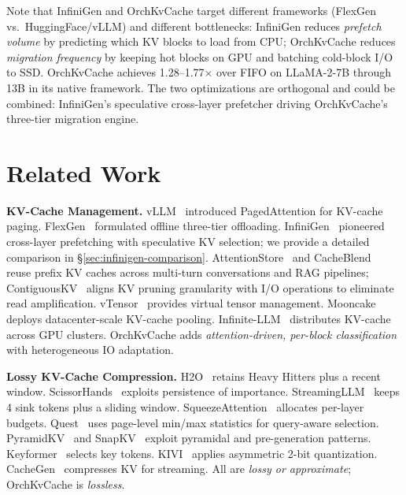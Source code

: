 \documentclass[conference]{IEEEtran}
\begin{document}
Note that InfiniGen and OrchKvCache target different frameworks (FlexGen vs.\ HuggingFace/vLLM) and different bottlenecks: InfiniGen reduces \emph{prefetch volume} by predicting which KV blocks to load from CPU; OrchKvCache reduces \emph{migration frequency} by keeping hot blocks on GPU and batching cold-block I/O to SSD.  OrchKvCache achieves 1.28--1.77$\times$ over FIFO on LLaMA-2-7B through 13B in its native framework.  The two optimizations are orthogonal and could be combined: InfiniGen's speculative cross-layer prefetcher driving OrchKvCache's three-tier migration engine.



\section{Related Work}

\textbf{KV-Cache Management.} vLLM~\cite{vllm} introduced PagedAttention for KV-cache paging. FlexGen~\cite{flexgen} formulated offline three-tier offloading. InfiniGen~\cite{infinigen} pioneered cross-layer prefetching with speculative KV selection; we provide a detailed comparison in \S\ref{sec:infinigen-comparison}. AttentionStore~\cite{attentionstore} and CacheBlend~\cite{cacheblend} reuse prefix KV caches across multi-turn conversations and RAG pipelines; ContiguousKV~\cite{contiguouskv} aligns KV pruning granularity with I/O operations to eliminate read amplification. vTensor~\cite{vtensor} provides virtual tensor management. Mooncake~\cite{mooncake} deploys datacenter-scale KV-cache pooling. Infinite-LLM~\cite{infinitellm} distributes KV-cache across GPU clusters. OrchKvCache adds \emph{attention-driven, per-block classification} with heterogeneous IO adaptation.

\textbf{Lossy KV-Cache Compression.} H2O~\cite{h2o} retains Heavy Hitters plus a recent window. ScissorHands~\cite{scissorhands} exploits persistence of importance. StreamingLLM~\cite{streamingllm} keeps 4 sink tokens plus a sliding window. SqueezeAttention~\cite{squeezeattention} allocates per-layer budgets. Quest~\cite{quest} uses page-level min/max statistics for query-aware selection. PyramidKV~\cite{pyramidkv} and SnapKV~\cite{snapkv} exploit pyramidal and pre-generation patterns. Keyformer~\cite{keyformer} selects key tokens. KIVI~\cite{kivi} applies asymmetric 2-bit quantization. CacheGen~\cite{cachegen} compresses KV for streaming. All are \emph{lossy or approximate}; OrchKvCache is \emph{lossless}.
\end{document}
